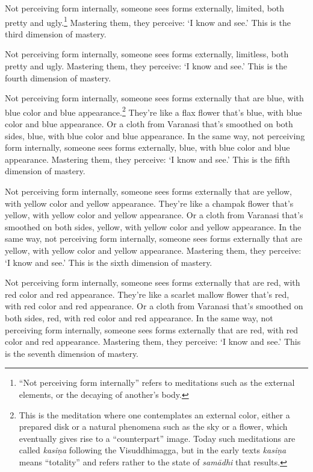 \documentclass[12pt,openany]{book}%
\begin{document}
Not perceiving form internally, someone sees forms externally, limited, both pretty and ugly.\footnote{“Not perceiving form internally” refers to meditations such as the external elements, or the decaying of another’s body. } Mastering them, they perceive: ‘I know and see.’ This is the third dimension of mastery. 

Not perceiving form internally, someone sees forms externally, limitless, both pretty and ugly. Mastering them, they perceive: ‘I know and see.’ This is the fourth dimension of mastery. 

Not perceiving form internally, someone sees forms externally that are blue, with blue color and blue appearance.\footnote{This is the meditation where one contemplates an external color, either a prepared disk or a natural phenomena such as the sky or a flower, which eventually gives rise to a “counterpart” image. Today such meditations are called \textit{\textsanskrit{kasiṇa}} following the Visuddhimagga, but in the early texts \textit{\textsanskrit{kasiṇa}} means “totality” and refers rather to the state of \textit{\textsanskrit{samādhi}} that results. } They’re like a flax flower that’s blue, with blue color and blue appearance. Or a cloth from Varanasi that’s smoothed on both sides, blue, with blue color and blue appearance. In the same way, not perceiving form internally, someone sees forms externally, blue, with blue color and blue appearance. Mastering them, they perceive: ‘I know and see.’ This is the fifth dimension of mastery. 

Not perceiving form internally, someone sees forms externally that are yellow, with yellow color and yellow appearance. They’re like a champak flower that’s yellow, with yellow color and yellow appearance. Or a cloth from Varanasi that’s smoothed on both sides, yellow, with yellow color and yellow appearance. In the same way, not perceiving form internally, someone sees forms externally that are yellow, with yellow color and yellow appearance. Mastering them, they perceive: ‘I know and see.’ This is the sixth dimension of mastery. 

Not perceiving form internally, someone sees forms externally that are red, with red color and red appearance. They’re like a scarlet mallow flower that’s red, with red color and red appearance. Or a cloth from Varanasi that’s smoothed on both sides, red, with red color and red appearance. In the same way, not perceiving form internally, someone sees forms externally that are red, with red color and red appearance. Mastering them, they perceive: ‘I know and see.’ This is the seventh dimension of mastery. 
\end{document}
